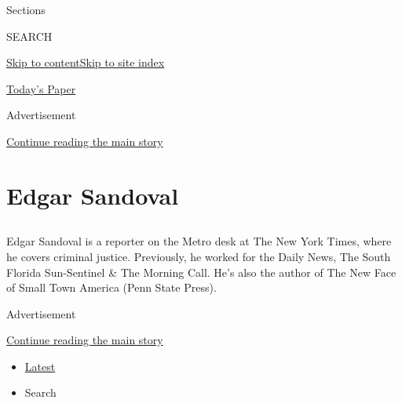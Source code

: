 Sections

SEARCH

\protect\hyperlink{site-content}{Skip to
content}\protect\hyperlink{site-index}{Skip to site index}

\href{https://myaccount.nytimes.com/auth/login?response_type=cookie\&client_id=vi}{}

\href{https://www.nytimes.com/section/todayspaper}{Today's Paper}

Advertisement

\protect\hyperlink{after-top}{Continue reading the main story}

\hypertarget{edgar-sandoval}{%
\section{Edgar Sandoval}\label{edgar-sandoval}}

\subsection{}

Edgar Sandoval is a reporter on the Metro desk at The New York Times,
where he covers criminal justice. Previously, he worked for the Daily
News, The South Florida Sun-Sentinel \& The Morning Call. He's also the
author of The New Face of Small Town America (Penn State Press).

Advertisement

\protect\hyperlink{after-mid1}{Continue reading the main story}

\begin{itemize}
\tightlist
\item
  \protect\hyperlink{stream-panel}{Latest}
\item
  Search
\end{itemize}

